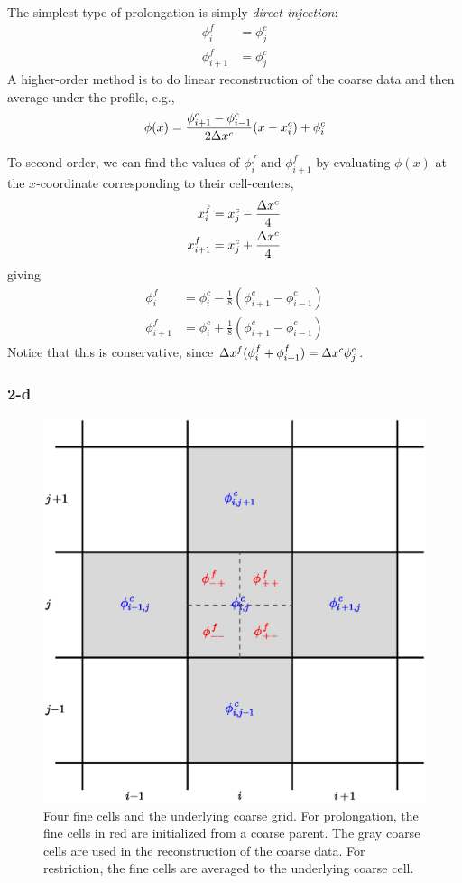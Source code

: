 The simplest type of 
prolongation is simply {\em direct injection}:
\begin{align}
\phi^f_i &= \phi^c_j \\
\phi^f_{i+1} &= \phi^c_j 
\end{align}
A higher-order method is to do linear reconstruction of the coarse
data and then average under the profile, e.g., 
\begin{equation}
\phi(x) = \frac{\phi^c_{i+1} - \phi^c_{i-1}}{2\Delta x^c} (x - x_i^c) + \phi_i^c
\end{equation}

To second-order, we can find the values of $\phi^f_i$ and
$\phi^f_{i+1}$  by evaluating $\phi(x)$ at the $x$-coordinate corresponding to their
cell-centers,
\begin{align}
x^f_i &= x^c_j - \frac{\Delta x^c}{4} \\
x^f_{i+1} &= x^c_j + \frac{\Delta x^c}{4}
\end{align}
giving
\begin{align}
\phi^f_i     &= \phi^c_i - \frac{1}{8} (\phi^c_{i+1} - \phi^c_{i-1}) \\
\phi^f_{i+1} &= \phi^c_i + \frac{1}{8} (\phi^c_{i+1} - \phi^c_{i-1}) 
\end{align}
Notice that this is conservative, since $\Delta x^f (\phi^f_i + \phi^f_{i+1}) = \Delta x^c \phi^c_j$.

\subsubsection{2-d}

\begin{figure}[t]
\centering
\includegraphics[width=0.8\linewidth]{2dgrid-prolong}
\caption[The geometry for 2-d
  prolongation and restriction]{\label{fig:2dgrid-prolong} Four fine cells and the
  underlying coarse grid.  For prolongation, the fine cells in red are
  initialized from a coarse parent.  The gray coarse cells are used in
  the reconstruction of the coarse data.  For restriction, the fine
  cells are averaged to the underlying coarse cell.}
\end{figure}


